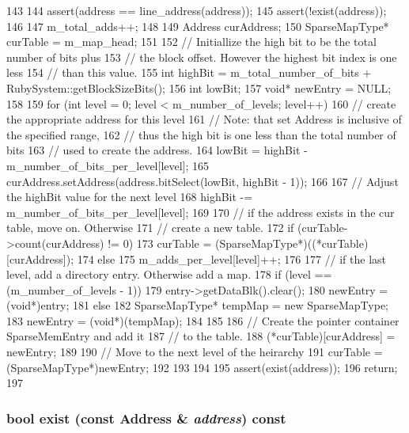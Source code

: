 \begin{DoxyCode}
143 {
144     assert(address == line_address(address));
145     assert(!exist(address));
146 
147     m_total_adds++;
148 
149     Address curAddress;
150     SparseMapType* curTable = m_map_head;
151 
152     // Initiallize the high bit to be the total number of bits plus
153     // the block offset.  However the highest bit index is one less
154     // than this value.
155     int highBit = m_total_number_of_bits + RubySystem::getBlockSizeBits();
156     int lowBit;
157     void* newEntry = NULL;
158 
159     for (int level = 0; level < m_number_of_levels; level++) {
160         // create the appropriate address for this level
161         // Note: that set Address is inclusive of the specified range,
162         // thus the high bit is one less than the total number of bits
163         // used to create the address.
164         lowBit = highBit - m_number_of_bits_per_level[level];
165         curAddress.setAddress(address.bitSelect(lowBit, highBit - 1));
166 
167         // Adjust the highBit value for the next level
168         highBit -= m_number_of_bits_per_level[level];
169 
170         // if the address exists in the cur table, move on.  Otherwise
171         // create a new table.
172         if (curTable->count(curAddress) != 0) {
173             curTable = (SparseMapType*)((*curTable)[curAddress]);
174         } else {
175             m_adds_per_level[level]++;
176 
177             // if the last level, add a directory entry.  Otherwise add a map.
178             if (level == (m_number_of_levels - 1)) {
179                 entry->getDataBlk().clear();
180                 newEntry = (void*)entry;
181             } else {
182                 SparseMapType* tempMap = new SparseMapType;
183                 newEntry = (void*)(tempMap);
184             }
185 
186             // Create the pointer container SparseMemEntry and add it
187             // to the table.
188             (*curTable)[curAddress] = newEntry;
189 
190             // Move to the next level of the heirarchy
191             curTable = (SparseMapType*)newEntry;
192         }
193     }
194 
195     assert(exist(address));
196     return;
197 }
\end{DoxyCode}
\hypertarget{classSparseMemory_a0035c3b58922453aa4b25cc73e4ef27a}{
\subsubsection[{exist}]{\setlength{\rightskip}{0pt plus 5cm}bool exist (const {\bf Address} \& {\em address}) const}}
\label{classSparseMemory_a0035c3b58922453aa4b25cc73e4ef27a}



